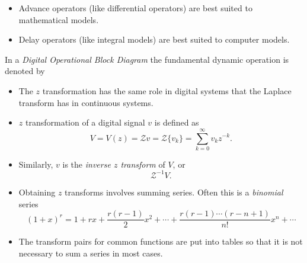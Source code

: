 \begin{slide}
  \label{slide:l7s6}
  \begin{itemize}
  \item Advance operators (like differential operators) are best suited
    to mathematical models.
  \item Delay operators (like integral models) are best suited to
    computer models.
  \end{itemize}
  In a \emph{Digital Operational Block Diagram} the fundamental
  dynamic operation is denoted by
  \begin{center}\end{center}
\end{slide}



\begin{slide}\label{slide:l8s1}
\begin{itemize}
 \item The $z$ transformation has the same role in digital systems
 that the Laplace transform has in continuous systems.
 \item $z$ transformation of a digital signal $v$ is defined as \[V =
 V(z) = \mathcal{Z} v = \mathcal{Z} \{ v_{k} \}=\sum_{k=0}^{\infty}
 v_k z^{-k}.\] 

 \item Similarly, $v$ is the \emph{inverse $z$
 transform} of $V$, or
   \[\mathcal{Z}^{-1} V.\]

\end{itemize}

\end{slide}


\begin{slide}\label{slide:l8s1a}

\begin{itemize}

\item Obtaining $z$ transforms involves summing series. Often this is a
\emph{binomial} series \[(1+x)^r = 1 + rx + \frac{r(r-1)}{2}x^2 +
\cdots + \frac{r(r-1)\cdots(r-n+1)}{n!}x^n + \cdots\]

\item The transform pairs for common functions
are put into tables so that it is not necessary to sum a series in
most cases.

\end{itemize}

\end{slide}

